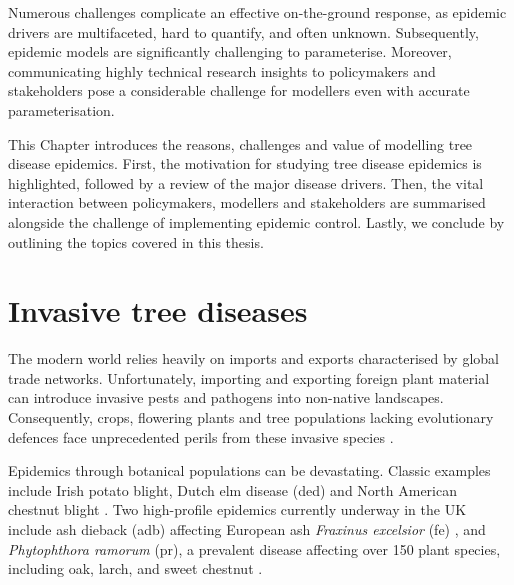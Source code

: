 Numerous challenges complicate an effective on-the-ground response, as epidemic drivers are multifaceted, hard to quantify, and often unknown. 
Subsequently, epidemic models are significantly challenging to parameterise. Moreover, communicating
highly technical research insights to policymakers and stakeholders pose a considerable challenge
for modellers even with accurate parameterisation. 

This Chapter introduces the reasons, challenges and value of modelling tree disease epidemics.
First, the motivation for studying tree disease epidemics is highlighted, followed by a review of the major disease drivers.
Then, the vital interaction between policymakers, modellers and stakeholders are summarised alongside the challenge of implementing epidemic control.
Lastly, we conclude by outlining the topics covered in this thesis.

\newpage

\section{Invasive tree diseases}

The modern world relies heavily on imports and exports characterised by global trade networks. 
Unfortunately, importing and exporting foreign plant material can introduce invasive pests and pathogens into non-native landscapes. 
Consequently, crops, flowering plants and tree populations lacking evolutionary defences face unprecedented perils from these invasive species \cite{doi:10.1002/9781444329988.ch8}.


Epidemics through botanical populations can be devastating.
Classic examples include Irish potato blight, Dutch elm disease (\acrshort{ded}) \cite{doi:10.1111/j.1365-3059.2010.02391.x} 
and North American chestnut blight \cite{doi:10.1002/9780470535486.ch7}.
Two high-profile epidemics currently underway in the UK include ash dieback (\acrshort{adb}) affecting European ash \textit{Fraxinus excelsior} (\acrshort{fe})
\cite{ash-dieback-costs}, and \textit{Phytophthora ramorum} (\acrshort{pr}), a prevalent disease affecting over 150 plant species, including oak, 
larch, and sweet chestnut \cite{p.ramourum}.

